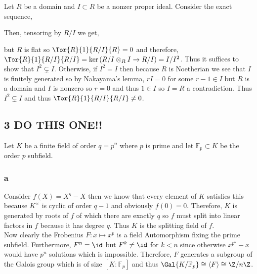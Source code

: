 \documentclass[12pt]{article}
\begin{document}
Let $R$ be a domain and $I \subset R$ be a nonzer proper ideal. Consider the exact sequence,
\begin{center}
\end{center}
Then, tensoring by $R / I$ we get,
\begin{center}
\end{center}
but $R$ is flat so $\Tor{R}{1}{R/I}{R} = 0$ and therefore, $\Tor{R}{1}{R/I}{R/I} = \ker{(R/I \otimes_R I \to R / I)} = I / I^2$. Thus it suffices to show that $I^2 \subsetneq I$. Otherwise, if $I^2 = I$ then because $R$ is Noetherian we see that $I$ is finitely generated so by Nakayama's lemma, $r I = 0$ for some $r - 1 \in I$ but $R$ is a domain and $I$ is nonzero so $r = 0$ and thus $1 \in I$ so $I = R$ a contradiction. Thus $I^2 \subsetneq I$ and thus $\Tor{R}{1}{R/I}{R/I} \neq 0$.

\subsection{3 DO THIS ONE!!}

Let $K$ be a finite field of order $q = p^n$ where $p$ is prime and let $\mathbb{F}_p \subset K$ be the order $p$ subfield.

\subsubsection{a}

Consider $f(X) = X^q - X$ then we know that every element of $K$ satisfies this because $K^\times$ is cyclic of order $q - 1$ and obviously $f(0) = 0$. Therefore, $K$ is generated by roots of $f$ of which there are exactly $q$ so $f$ must split into linear factors in $f$ because it has degree $q$. Thus $K$ is the splitting field of $f$.
\bigskip\\
Now clearly the Frobenius $F : x \mapsto x^p$ is a field Automorphism fixing the prime subfield. Furthermore, $F^n = \id$ but $F^k \neq \id$ for $k < n$ since otherwise $x^{p^k} - x$ would have $p^n$ solutions which is impossible. Therefore, $F$ generates a subgroup of the Galois group which is of size $[K : \mathbb{F}_p]$ and thus $\Gal{K / \mathbb{F}_p} \cong \left< F \right> \cong \Z / n \Z$.
\end{document}

